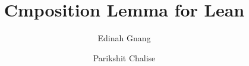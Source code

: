 \documentclass{amsbook}
\title{\texorpdfstring Composition Lemma for Lean}
\author{Edinah Gnang}
\author{Parikshit Chalise}
\begin{document}
\linenumbers
\maketitle
\tableofcontents





\end{document}
